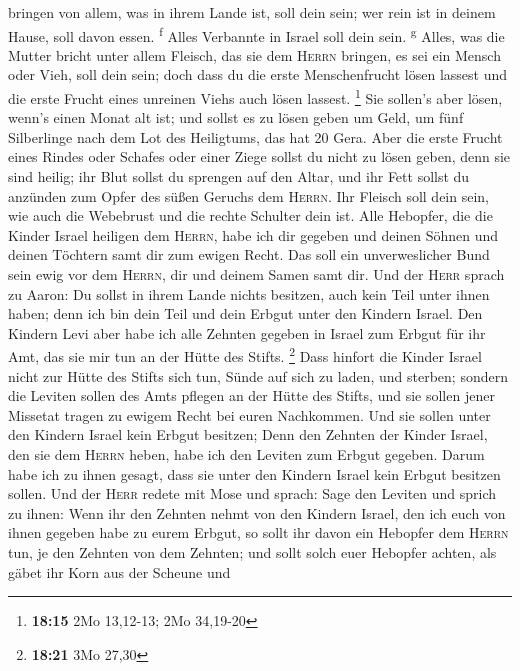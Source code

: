 bringen von allem, was in ihrem Lande ist, soll dein sein; wer rein ist
in deinem Hause, soll davon essen. \textsuperscript{f} 
Alles Verbannte in Israel soll dein sein. \textsuperscript{g}
 Alles, was die Mutter bricht unter allem Fleisch, das
sie dem \textsc{Herrn} bringen, es sei ein Mensch oder Vieh, soll dein
sein; doch dass du die erste Menschenfrucht lösen lassest und die erste
Frucht eines unreinen Viehs auch lösen lassest. \footnote{\textbf{18:15}
  2Mo 13,12-13; 2Mo 34,19-20}  Sie sollen's aber lösen,
wenn's einen Monat alt ist; und sollst es zu lösen geben um Geld, um
fünf Silberlinge nach dem Lot des Heiligtums, das hat 20 Gera.
 Aber die erste Frucht eines Rindes oder Schafes oder
einer Ziege sollst du nicht zu lösen geben, denn sie sind heilig; ihr
Blut sollst du sprengen auf den Altar, und ihr Fett sollst du anzünden
zum Opfer des süßen Geruchs dem \textsc{Herrn}.  Ihr
Fleisch soll dein sein, wie auch die Webebrust und die rechte Schulter
dein ist.  Alle Hebopfer, die die Kinder Israel heiligen
dem \textsc{Herrn}, habe ich dir gegeben und deinen Söhnen und deinen
Töchtern samt dir zum ewigen Recht. Das soll ein unverweslicher Bund
sein ewig vor dem \textsc{Herrn}, dir und deinem Samen samt dir.
 Und der \textsc{Herr} sprach zu Aaron: Du sollst in
ihrem Lande nichts besitzen, auch kein Teil unter ihnen haben; denn ich
bin dein Teil und dein Erbgut unter den Kindern Israel. 
Den Kindern Levi aber habe ich alle Zehnten gegeben in Israel zum Erbgut
für ihr Amt, das sie mir tun an der Hütte des Stifts. \footnote{\textbf{18:21}
  3Mo 27,30}  Dass hinfort die Kinder Israel nicht zur
Hütte des Stifts sich tun, Sünde auf sich zu laden, und sterben;
 sondern die Leviten sollen des Amts pflegen an der Hütte
des Stifts, und sie sollen jener Missetat tragen zu ewigem Recht bei
euren Nachkommen. Und sie sollen unter den Kindern Israel kein Erbgut
besitzen;  Denn den Zehnten der Kinder Israel, den sie
dem \textsc{Herrn} heben, habe ich den Leviten zum Erbgut gegeben. Darum
habe ich zu ihnen gesagt, dass sie unter den Kindern Israel kein Erbgut
besitzen sollen.  Und der \textsc{Herr} redete mit Mose
und sprach:  Sage den Leviten und sprich zu ihnen: Wenn
ihr den Zehnten nehmt von den Kindern Israel, den ich euch von ihnen
gegeben habe zu eurem Erbgut, so sollt ihr davon ein Hebopfer dem
\textsc{Herrn} tun, je den Zehnten von dem Zehnten;  und
sollt solch euer Hebopfer achten, als gäbet ihr Korn aus der Scheune und
